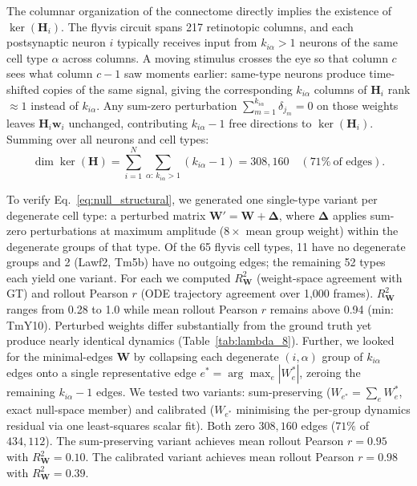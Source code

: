 \documentclass{article}
\begin{document}
The columnar organization of the connectome directly implies the
existence of $\ker(\mathbf{H}_i)$. The flyvis circuit
spans 217 retinotopic columns, and each postsynaptic neuron $i$ typically
receives input from $k_{i\alpha} > 1$ neurons of the same cell type $\alpha$
across columns. A moving stimulus crosses the eye so that column $c$ sees
what column $c-1$ saw moments earlier: same-type neurons produce time-shifted
copies of the same signal, giving the corresponding $k_{i\alpha}$ columns of
$\mathbf{H}_i$ rank $\approx 1$ instead of $k_{i\alpha}$. Any sum-zero
perturbation $\sum_{m=1}^{k_{i\alpha}} \delta_{j_m} = 0$ on those weights
leaves $\mathbf{H}_i \mathbf{w}_i$ unchanged, contributing $k_{i\alpha} - 1$
free directions to $\ker(\mathbf{H}_i)$. Summing over all neurons and cell
types:
\begin{equation}
  \dim\ker(\mathbf{H}) = \sum_{i=1}^{N}\sum_{\alpha:\,k_{i\alpha}>1}(k_{i\alpha}-1)
  = 308{,}160 \quad (71\%\ \text{of edges}).
  \label{eq:null_structural}
\end{equation}

To verify Eq.~\eqref{eq:null_structural}, we generated one single-type variant
per degenerate cell type: a perturbed matrix $\mathbf{W}' = \mathbf{W} +
\boldsymbol{\Delta}$, where $\boldsymbol{\Delta}$ applies sum-zero perturbations
at maximum amplitude ($8\times$ mean group weight) within the degenerate groups
of that type. Of the 65 flyvis cell types, 11 have no degenerate groups and 2
(Lawf2, Tm5b) have no outgoing edges; the remaining 52 types each yield one
variant. For each we computed $R^2_{\mathbf{W}}$ (weight-space agreement with GT)
and rollout Pearson $r$ (ODE trajectory agreement over 1{,}000 frames).
$R^2_{\mathbf{W}}$ ranges from 0.28 to 1.0 while mean rollout Pearson $r$ remains
above 0.94 (min: TmY10). Perturbed weights differ substantially from the ground
truth yet produce nearly identical dynamics (Table~\ref{tab:lambda_8}). Further, we looked for the minimal-edges $\mathbf{W}$ by collapsing each degenerate $(i,\alpha)$ group of $k_{i\alpha}$ edges onto a
single representative edge $e^* = \arg\max_e |W_e^*|$, zeroing the remaining
$k_{i\alpha}-1$ edges. We tested two variants: sum-preserving
($W_{e^*} = \sum_e W_e^*$, exact null-space member) and calibrated
($W_{e^*}$ minimising the per-group dynamics residual via one least-squares
scalar fit). Both zero $308{,}160$ edges ($71\%$ of $434{,}112$). The sum-preserving variant achieves mean rollout Pearson $r = 0.95$ with $R^2_{\mathbf{W}} = 0.10$.
The calibrated variant achieves mean rollout Pearson $r = 0.98$ with $R^2_{\mathbf{W}} = 0.39$.
\end{document}
